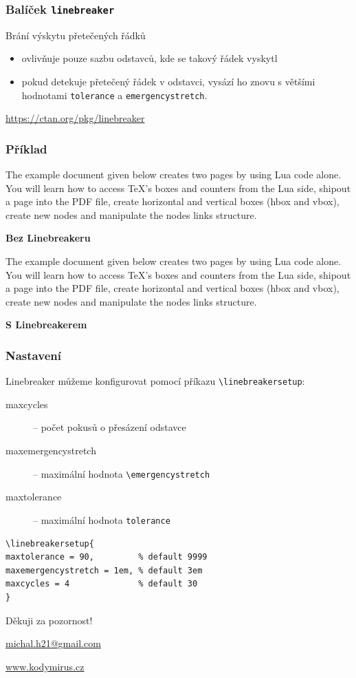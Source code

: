 \newcommand\testbox[1]{%
  \parbox{150pt}{%
    \parindent=15pt%
    \tolerance=1%
    \pretolerance=1%
    #1
  }%
}

\newcommand\printtest[1]{%
  \linebreakerdisable%
  \noindent\testbox{%
    #1
    \par\medskip\noindent\hfill\textbf{Bez Linebreakeru}\hfill\null
  }%
  \linebreakerenable%
  \hfill%
  \testbox{%
    #1
    \par\medskip\noindent\hfill\textbf{S Linebreakerem}\hfill\null
  }%
}


\begin{frame}[fragile]
  \frametitle{Balíček \texttt{linebreaker}}
  Brání výskytu přetečených řádků
  \begin{itemize}
    \item ovlivňuje pouze sazbu  odstavců, kde se takový řádek vyskytl
    \item pokud detekuje přetečený řádek v odstavci, vysází ho znovu s většími hodnotami
      \verb|tolerance| a \verb|emergencystretch|.
  \end{itemize}
  \url{https://ctan.org/pkg/linebreaker}
\end{frame}
  
\begin{frame}
  \frametitle{Příklad}
  \printtest{
    The example document given below creates two pages by using Lua code alone. You
will learn how to access TeX's boxes and counters from the Lua side, shipout a
page into the PDF file, create horizontal and vertical boxes (hbox and vbox),
create new nodes and manipulate the nodes links structure. 
  }

\end{frame}
 
\begin{frame}[fragile]
  \frametitle{Nastavení}
  Linebreaker můžeme konfigurovat pomocí příkazu \verb|\linebreakersetup|:
  \begin{description}
    \item[maxcycles] -- počet pokusů o přesázení odstavce
    \item[maxemergencystretch] -- maximální hodnota \verb|\emergencystretch|
    \item[maxtolerance]  -- maximální hodnota \verb|tolerance|
  \end{description}
\begin{verbatim}
\linebreakersetup{
maxtolerance = 90,         % default 9999
maxemergencystretch = 1em, % default 3em
maxcycles = 4              % default 30
}
\end{verbatim}

\end{frame}


\begin{frame}[standout]

 
  Děkuji za pozornost!

  \url{michal.h21@gmail.com}

  \url{www.kodymirus.cz}

\end{frame}
